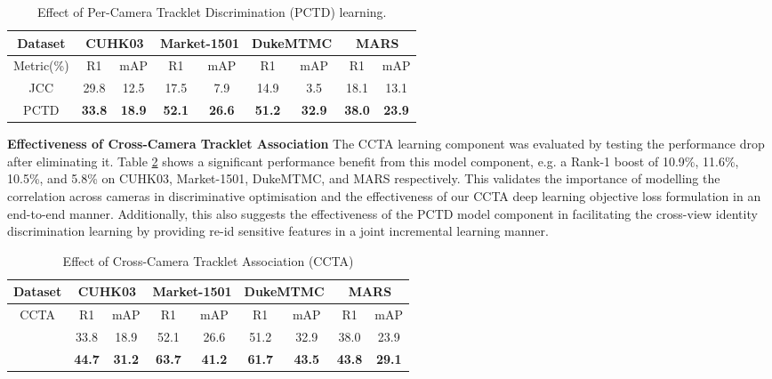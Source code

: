 \documentclass[runningheads]{llncs}
\begin{document}
\begin{table}[h]
	\centering
	\setlength{\tabcolsep}{0.1cm}
	\caption{Effect of Per-Camera Tracklet Discrimination  (PCTD) learning.}
	\label{tab:PCJL}
	\begin{tabular}
		{c||c|c||c|c||c|c||c|c}
		\hline
		Dataset				
		& \multicolumn{2}{c||}{CUHK03\cite{li2014deepreid}}				& \multicolumn{2}{c||}{Market-1501\cite{zheng2015scalable}}				& \multicolumn{2}{c||}{DukeMTMC\cite{ristani2016MTMC}}		& \multicolumn{2}{c}{MARS\cite{zheng2016mars}}			\\ \hline 
		Metric(\%)	& R1	& mAP		& R1	& mAP		& R1	& mAP			& R1	& mAP
		\\ \hline \hline
		JCC		& 29.8	& 12.5		& 17.5	& 7.9		& 14.9	& 3.5			& 18.1	& 13.1
		\\ \hline
		PCTD		& \textbf{33.8}	& \textbf{18.9}		& \textbf{52.1}		& \textbf{26.6}
					& \textbf{51.2}	& \textbf{32.9}		& \textbf{38.0}		& \textbf{23.9}
		\\ \hline
	\end{tabular}
\end{table}

\noindent \textbf{Effectiveness of Cross-Camera Tracklet Association } The CCTA learning component
was evaluated by testing the performance drop after eliminating it.
Table \ref{tab:TA} shows a significant performance benefit
from this model component, 
e.g. a Rank-1 boost of 
10.9\%, 11.6\%, 10.5\%, and 5.8\% 
on CUHK03, Market-1501, DukeMTMC, and MARS respectively.
This validates the importance of modelling the correlation across 
cameras in discriminative optimisation
and the effectiveness of our CCTA deep learning objective loss formulation
in an end-to-end manner.
Additionally, this also suggests the 
effectiveness of the PCTD model component
in facilitating the cross-view identity discrimination learning
by providing re-id sensitive features
in a joint incremental learning manner.

\begin{table}[h]
	\centering
	\setlength{\tabcolsep}{0.1cm}
	\caption{Effect of Cross-Camera Tracklet Association (CCTA)}
	\label{tab:TA}
	\begin{tabular}
		{c||c|c||c|c||c|c||c|c}
		\hline
		Dataset				
		& \multicolumn{2}{c||}{CUHK03\cite{li2014deepreid}}				& \multicolumn{2}{c||}{Market-1501\cite{zheng2015scalable}}				& \multicolumn{2}{c||}{DukeMTMC\cite{zheng2017unlabeled}}		& \multicolumn{2}{c}{MARS\cite{zheng2016mars}}			\\ \hline
		CCTA		& R1	& mAP		& R1	& mAP			& R1	& mAP			& R1	& mAP
		\\ \hline \hline
		\xmark		& 33.8	& 18.9		& 52.1	& 26.6		& 51.2	& 32.9		& 38.0	& 23.9
		\\ \hline
		\cmark		
		& \textbf{44.7}	& \textbf{31.2}		& \textbf{63.7}	& \textbf{41.2}			& \textbf{61.7}	& \textbf{43.5}				& \textbf{43.8}		& \textbf{29.1}
		\\ \hline
	\end{tabular}
\end{table}
\end{document}
